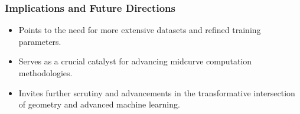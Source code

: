\begin{frame}[fragile]\frametitle{Implications and Future Directions}
    \begin{itemize}
        \item Points to the need for more extensive datasets and refined training parameters.
        \item Serves as a crucial catalyst for advancing midcurve computation methodologies.
        \item Invites further scrutiny and advancements in the transformative intersection of geometry and advanced machine learning.
    \end{itemize}
\end{frame}
